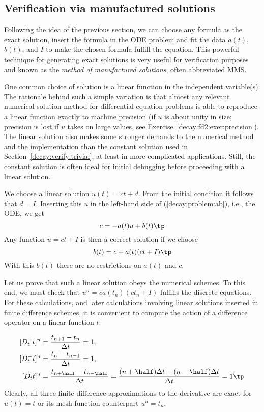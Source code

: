 \documentclass[graybox,sectrefs,envcountresetchap,open=right,final]{svmonodo}
\begin{document}
\subsection{Verification via manufactured solutions}
\label{decay:MMS}


Following the idea of the previous section, we can choose any formula
as the exact solution, insert the formula in the ODE problem and fit
the data $a(t)$, $b(t)$, and $I$ to make the chosen
formula fulfill the equation. This
powerful technique for generating exact solutions is very useful for
verification purposes and known as the \emph{method of manufactured
solutions}, often abbreviated MMS.

One common choice of solution is a linear function in the independent
variable(s). The rationale behind such a simple variation is that
almost any relevant numerical solution method for differential
equation problems is able to reproduce a linear function exactly to
machine precision (if $u$ is about unity in size; precision is lost if
$u$ takes on large values, see Exercise~\ref{decay:fd2:exer:precision}).
The linear solution also makes some stronger demands to the
numerical method and the implementation than the constant solution
used in Section~\ref{decay:verify:trivial}, at least in more
complicated applications. Still, the constant solution is often
ideal for initial debugging before proceeding with a linear solution.

We choose a linear solution $u(t) = ct + d$. From the initial condition it
follows that $d=I$.
Inserting this $u$ in the left-hand side of (\ref{decay:problem:ab}), i.e.,
the ODE, we get
\[ c = -a(t)u + b(t) \tp  \]
Any function $u=ct+I$ is then a correct solution if we choose
\[ b(t) = c + a(t)(ct + I) \tp  \]
With this $b(t)$ there are no restrictions on $a(t)$ and $c$.

Let us prove that such a linear solution obeys the numerical
schemes. To this end, we must check that $u^n = ca(t_n)(ct_n+I)$
fulfills the discrete equations. For these calculations, and
later calculations involving linear solutions inserted in
finite difference schemes, it is convenient to
compute the action of a difference operator on a linear function $t$:

\begin{align}
\lbrack D_t^+ t\rbrack^n &= \frac{t_{n+1}-t_n}{\Delta t}=1,
\label{decay:fd2:Dop:tn:fw}\\ 
\lbrack D_t^- t\rbrack^n &= \frac{t_{n}-t_{n-1}}{\Delta t}=1,
\label{decay:fd2:Dop:tn:bw}\\ 
\lbrack D_t t\rbrack^n &= \frac{t_{n+\half}-t_{n-\half}}{\Delta t}=\frac{(n+\half)\Delta t - (n-\half)\Delta t}{\Delta t}=1
\label{decay:fd2:Dop:tn:cn}
\tp
\end{align}
Clearly, all three finite difference approximations to the derivative are
exact for $u(t)=t$ or its mesh function counterpart $u^n = t_n$.
\end{document}
